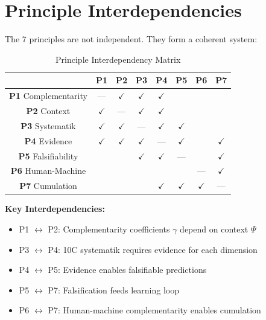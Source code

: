 \section{Principle Interdependencies}
\label{sec:pr-interdependencies}

The 7 principles are not independent. They form a coherent system:

\begin{table}[htbp]
\centering
\caption{Principle Interdependency Matrix}
\label{tab:pr-interdependencies}
\renewcommand{\arraystretch}{1.3}
\begin{tabular}{@{}c|ccccccc@{}}
\toprule
 & \textbf{P1} & \textbf{P2} & \textbf{P3} & \textbf{P4} & \textbf{P5} & \textbf{P6} & \textbf{P7} \\
\midrule
\textbf{P1} Complementarity & --- & $\checkmark$ & $\checkmark$ & $\checkmark$ & & & \\
\textbf{P2} Context & $\checkmark$ & --- & $\checkmark$ & $\checkmark$ & & & \\
\textbf{P3} Systematik & $\checkmark$ & $\checkmark$ & --- & $\checkmark$ & $\checkmark$ & & \\
\textbf{P4} Evidence & $\checkmark$ & $\checkmark$ & $\checkmark$ & --- & $\checkmark$ & & $\checkmark$ \\
\textbf{P5} Falsifiability & & & $\checkmark$ & $\checkmark$ & --- & & $\checkmark$ \\
\textbf{P6} Human-Machine & & & & & & --- & $\checkmark$ \\
\textbf{P7} Cumulation & & & & $\checkmark$ & $\checkmark$ & $\checkmark$ & --- \\
\bottomrule
\end{tabular}
\end{table}

\textbf{Key Interdependencies:}
\begin{itemize}[nosep]
    \item P1 $\leftrightarrow$ P2: Complementarity coefficients $\gamma$ depend on context $\Psi$
    \item P3 $\leftrightarrow$ P4: 10C systematik requires evidence for each dimension
    \item P4 $\leftrightarrow$ P5: Evidence enables falsifiable predictions
    \item P5 $\leftrightarrow$ P7: Falsification feeds learning loop
    \item P6 $\leftrightarrow$ P7: Human-machine complementarity enables cumulation
\end{itemize}


